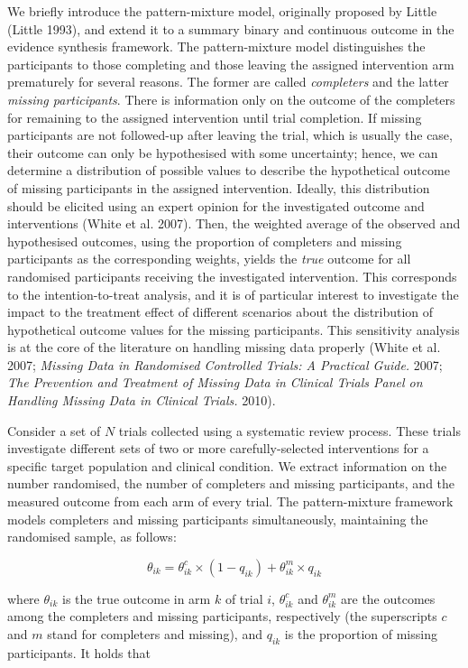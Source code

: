 We briefly introduce the pattern-mixture model, originally proposed by Little
(Little 1993), and extend it to a summary binary and continuous outcome in the
evidence synthesis framework. The pattern-mixture model distinguishes the participants
to those completing and those leaving the assigned intervention arm prematurely
for several reasons. The former are called \emph{completers} and the latter
\emph{missing participants}. There is information only on the outcome of the completers
for remaining to the assigned intervention until trial completion. If missing
participants are not followed-up after leaving the trial, which is usually the case,
their outcome can only be hypothesised with some uncertainty; hence, we can determine
a distribution of possible values to describe the hypothetical outcome of missing
participants in the assigned intervention. Ideally, this distribution should be elicited
using an expert opinion for the investigated outcome and interventions (White et al. 2007).
Then, the weighted average of the observed and hypothesised outcomes, using the
proportion of completers and missing participants as the corresponding weights,
yields the \emph{true} outcome for all randomised participants receiving the investigated
intervention. This corresponds to the intention-to-treat analysis, and it is of
particular interest to investigate the impact to the treatment effect of different
scenarios about the distribution of hypothetical outcome values for the missing
participants. This sensitivity analysis is at the core of the literature on
handling missing data properly (White et al. 2007; \emph{Missing Data in Randomised Controlled Trials: A Practical Guide.} 2007; \emph{The Prevention and Treatment of Missing Data in Clinical Trials Panel on Handling Missing Data in Clinical Trials.} 2010).

Consider a set of \(N\) trials collected using a systematic review process. These
trials investigate different sets of two or more carefully-selected interventions
for a specific target population and clinical condition. We extract information on
the number randomised, the number of completers and missing participants, and the
measured outcome from each arm of every trial. The pattern-mixture framework models
completers and missing participants simultaneously, maintaining the randomised
sample, as follows:

\[
\theta_{ik} = \theta^{c}_{ik} \times (1 - q_{ik}) + \theta^{m}_{ik} \times q_{ik} 
\tag{1}
\]

where \(\theta_{ik}\) is the true outcome in arm \(k\) of trial \(i\), \(\theta^{c}_{ik}\)
and \(\theta^{m}_{ik}\) are the outcomes among the completers and missing participants,
respectively (the superscripts \(c\) and \(m\) stand for completers and missing), and
\(q_{ik}\) is the proportion of missing participants. It holds that

